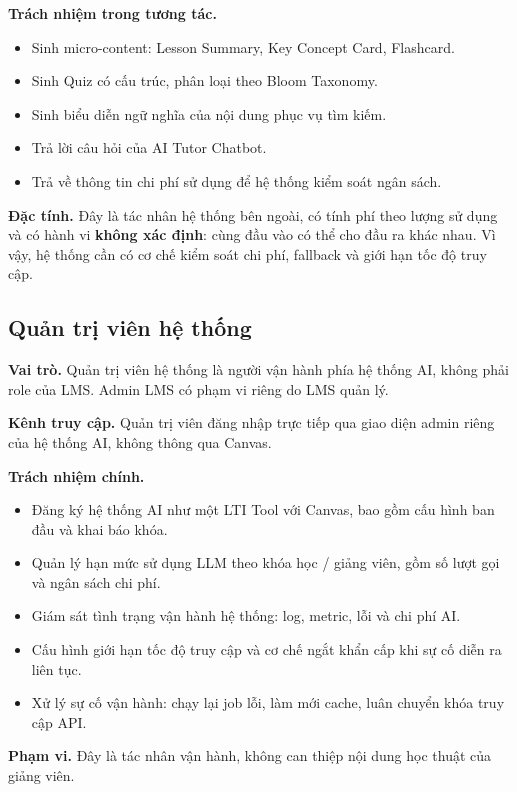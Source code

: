 \textbf{Trách nhiệm trong tương tác.}

\begin{itemize}
    \item Sinh micro-content: Lesson Summary, Key Concept Card, Flashcard.
    \item Sinh Quiz có cấu trúc, phân loại theo Bloom Taxonomy.
    \item Sinh biểu diễn ngữ nghĩa của nội dung phục vụ tìm kiếm.
    \item Trả lời câu hỏi của AI Tutor Chatbot.
    \item Trả về thông tin chi phí sử dụng để hệ thống kiểm soát ngân sách.
\end{itemize}

\textbf{Đặc tính.} Đây là tác nhân hệ thống bên ngoài, có tính phí theo lượng
sử dụng và có hành vi \textbf{không xác định}: cùng đầu vào có thể cho đầu ra
khác nhau. Vì vậy, hệ thống cần có cơ chế kiểm soát chi phí, fallback và giới
hạn tốc độ truy cập.

\subsection{Quản trị viên hệ thống}

\textbf{Vai trò.} Quản trị viên hệ thống là người vận hành phía hệ thống AI,
không phải role của LMS. Admin LMS có phạm vi riêng do LMS quản lý.

\textbf{Kênh truy cập.} Quản trị viên đăng nhập trực tiếp qua giao diện admin
riêng của hệ thống AI, không thông qua Canvas.

\textbf{Trách nhiệm chính.}

\begin{itemize}
    \item Đăng ký hệ thống AI như một LTI Tool với Canvas, bao gồm cấu hình ban
          đầu và khai báo khóa.
    \item Quản lý hạn mức sử dụng LLM theo khóa học / giảng viên, gồm số lượt
          gọi và ngân sách chi phí.
    \item Giám sát tình trạng vận hành hệ thống: log, metric, lỗi và chi phí
          AI.
    \item Cấu hình giới hạn tốc độ truy cập và cơ chế ngắt khẩn cấp khi sự cố
          diễn ra liên tục.
    \item Xử lý sự cố vận hành: chạy lại job lỗi, làm mới cache, luân chuyển
          khóa truy cập API.
\end{itemize}

\textbf{Phạm vi.} Đây là tác nhân vận hành, không can thiệp nội dung học thuật
của giảng viên.

